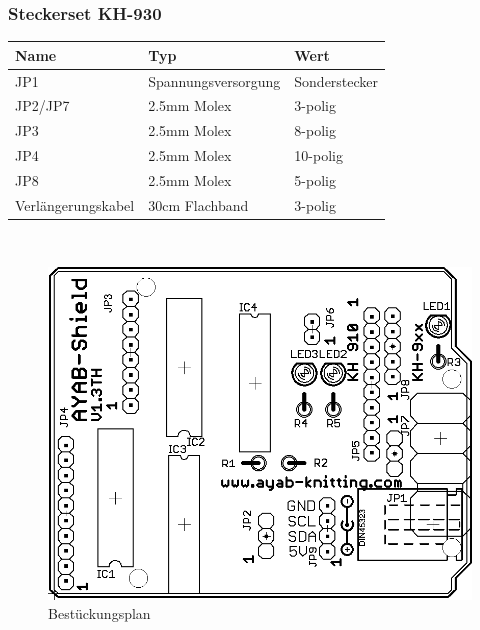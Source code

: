 \documentclass[fleqn,10pt]{SelfArx} %
\begin{document}
\subsubsection*{Steckerset KH-930}

\begin{tabular}{lll}
\hline
\textbf{Name}      & \textbf{Typ}        & \textbf{Wert}  \\ \hline
JP1                & Spannungsversorgung & Sonderstecker  \\ \hline
JP2/JP7            & 2.5mm Molex         & 3-polig        \\ \hline
JP3                & 2.5mm Molex         & 8-polig        \\ \hline
JP4                & 2.5mm Molex         & 10-polig       \\ \hline
JP8                & 2.5mm Molex         & 5-polig        \\ \hline
Verlängerungskabel & 30cm Flachband      & 3-polig        \\ \hline
\end{tabular}\\

 \begin{figure}[tbhp]\centering
 \includegraphics[width=\linewidth]{shield}
 \caption{Bestückungsplan}
 \end{figure}

 \FloatBarrier
\end{document}
